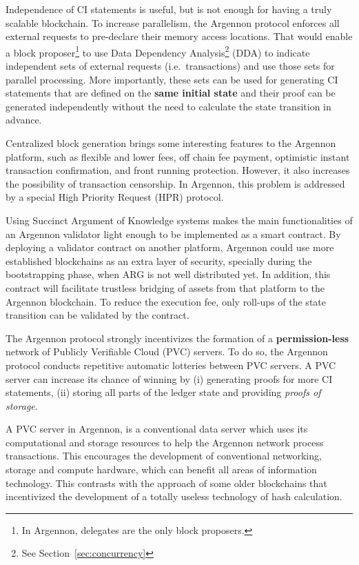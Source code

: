 Independence of CI statements is useful, but is not enough for having a truly scalable blockchain. To increase
parallelism, the Argennon protocol enforces all external requests to pre-declare their memory access locations. That
would enable a block proposer\footnote{In Argennon, delegates are the only block proposers.} to use Data Dependency
Analysis\footnote{See Section~\ref{sec:concurrency}} (DDA) to indicate independent sets of external requests (i.e.\
transactions) and use those sets for parallel processing. More importantly, these sets can be used for generating CI
statements that are defined on the \textbf{same initial state} and their proof can be generated independently without
the need to calculate the state transition in advance.

Centralized block generation brings some interesting features to the Argennon platform, such as flexible and lower
fees, off chain fee payment, optimistic instant transaction confirmation, and front running protection.
However, it also increases the possibility of transaction censorship. In Argennon, this problem is addressed by a
special High Priority Request (HPR) protocol.

Using Succinct Argument of Knowledge systems makes the main functionalities of an Argennon validator light enough to
be implemented as a smart contract. By deploying a validator contract on another platform, Argennon
could use more established blockchains as an extra layer of security, specially
during the bootstrapping phase, when ARG is not well distributed yet. In addition, this contract will facilitate
trustless bridging of assets from that platform to the Argennon blockchain. To reduce the execution fee, only
roll-ups of the state transition can be validated by the contract.

The Argennon protocol strongly incentivizes the formation of a \textbf{permission-less} network of Publicly Verifiable
Cloud (PVC) servers. To do so, the Argennon protocol conducts repetitive automatic lotteries between PVC servers.
A PVC server can increase its chance of winning by (i) generating proofs for more CI statements, (ii) storing all
parts of the ledger state and providing \emph{proofs of storage}.

A PVC server in Argennon, is a conventional data server which uses its computational and
storage resources to help the Argennon network process transactions. This encourages the development
of conventional networking, storage and compute hardware, which can benefit all areas of information technology.
This contrasts with the approach of some older blockchains that incentivized the development of a totally
useless technology of hash calculation.

